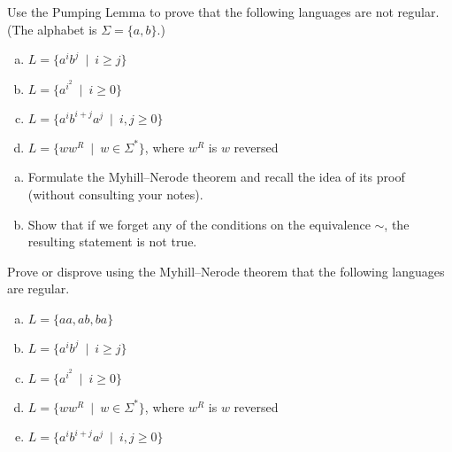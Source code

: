 \documentclass[a4paper,12pt]{amsart}
\begin{document}
    
\medskip\begin{problem}
    
    Use the Pumping Lemma to prove that the following languages are not regular. (The alphabet is $\Sigma=\{a,b\}$.)
    
    \medskip
      
    \begin{enumerate}[(a)]\setlength\itemsep{6pt}        
        \item $L=\{a^ib^j\ \mid\ i\geq j\}$       
        \item $L=\{a^{i^2}\ \mid\ i\geq 0\}$        
        \item $L=\{a^ib^{i+j}a^j\ \mid\ i,j\geq 0\}$
        \item $L=\{ww^R\ \mid \ w\in\Sigma^*\}$, where $w^R$ is $w$ reversed
    \end{enumerate}
      
\end{problem}


\medskip\begin{problem}
    
    \begin{enumerate}[(a)]
        \item Formulate the Myhill--Nerode theorem and recall the idea of its proof (without consulting your notes).
        \item Show that if we forget any of the conditions on the equivalence $\sim$, the resulting statement is not true.
    \end{enumerate}
    

\end{problem}


\medskip\begin{problem}

    Prove or disprove using the Myhill--Nerode theorem that the following languages are regular.
    \begin{enumerate}[(a)]\setlength\itemsep{6pt}
        \item $L=\{aa, ab, ba\}$        
        \item $L=\{a^ib^j\ \mid\ i\geq j\}$        
        \item $L=\{a^{i^2}\ \mid\ i\geq 0\}$ 
        \item $L=\{ww^R\ \mid \ w\in\Sigma^*\}$, where $w^R$ is $w$ reversed
        \item $L=\{a^ib^{i+j}a^j\ \mid\ i,j\geq 0\}$        
    \end{enumerate}

\end{problem}
\end{document}

